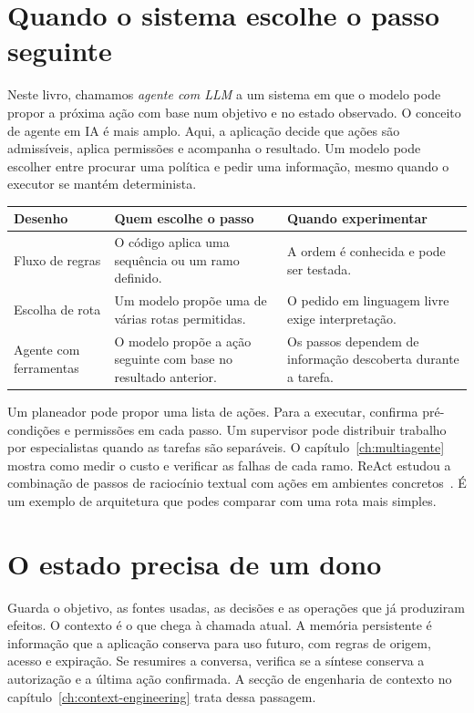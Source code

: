 \section{Quando o sistema escolhe o passo seguinte}

Neste livro, chamamos \emph{agente com LLM} a um sistema em que o modelo pode propor a próxima ação com base num objetivo e no estado observado. O conceito de agente em IA é mais amplo. Aqui, a aplicação decide que ações são admissíveis, aplica permissões e acompanha o resultado. Um modelo pode escolher entre procurar uma política e pedir uma informação, mesmo quando o executor se mantém determinista.

\begin{center}
\small
\begin{tabularx}{\textwidth}{@{}p{}XX@{}}
\toprule
Desenho & Quem escolhe o passo & Quando experimentar \\
\midrule
Fluxo de regras & O código aplica uma sequência ou um ramo definido. & A ordem é conhecida e pode ser testada. \\
Escolha de rota & Um modelo propõe uma de várias rotas permitidas. & O pedido em linguagem livre exige interpretação. \\
Agente com ferramentas & O modelo propõe a ação seguinte com base no resultado anterior. & Os passos dependem de informação descoberta durante a tarefa. \\
\bottomrule
\end{tabularx}
\end{center}

Um planeador pode propor uma lista de ações. Para a executar, confirma pré-condições e permissões em cada passo. Um supervisor pode distribuir trabalho por especialistas quando as tarefas são separáveis. O capítulo~\ref{ch:multiagente} mostra como medir o custo e verificar as falhas de cada ramo. ReAct estudou a combinação de passos de raciocínio textual com ações em ambientes concretos~\citep{yao2023react}. É um exemplo de arquitetura que podes comparar com uma rota mais simples.

\section{O estado precisa de um dono}

Guarda o objetivo, as fontes usadas, as decisões e as operações que já produziram efeitos. O contexto é o que chega à chamada atual. A memória persistente é informação que a aplicação conserva para uso futuro, com regras de origem, acesso e expiração. Se resumires a conversa, verifica se a síntese conserva a autorização e a última ação confirmada. A secção de engenharia de contexto no capítulo~\ref{ch:context-engineering} trata dessa passagem.

